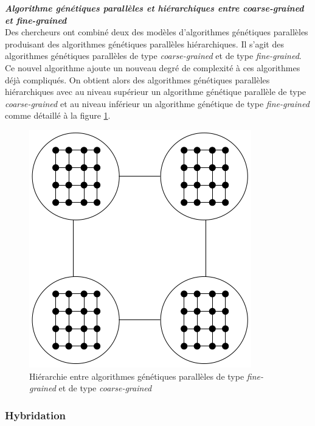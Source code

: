 	\textsl{\textbf{Algorithme génétiques parallèles et hiérarchiques entre \emph{coarse-grained} et \emph{fine-grained}}}\\
	
	Des chercheurs \cite{cant2} ont combiné deux des modèles d'algorithmes génétiques parallèles produisant des algorithmes génétiques parallèles hiérarchiques. Il s'agit des algorithmes génétiques parallèles de type \emph{coarse-grained} et de type \emph{fine-grained}. Ce nouvel algorithme ajoute un nouveau degré de complexité à ces algorithmes déjà compliqués. On obtient alors des algorithmes génétiques parallèles hiérarchiques avec au niveau supérieur un algorithme génétique parallèle de type \emph{coarse-grained} et au niveau inférieur un algorithme génétique de type \emph{fine-grained} comme détaillé à la figure \ref{fig:hierar_fine_grained_fig}.
	
	\begin{figure}[!h]
		\begin{center}
			\includegraphics[scale=.3]{images/hierar_fine_grained_fig.png}
			\caption{Hiérarchie entre algorithmes génétiques parallèles de type \emph{fine-grained} et de type \emph{coarse-grained} \cite{cant2}}
			\label{fig:hierar_fine_grained_fig}
		\end{center}
	\end{figure} 
	
	\subsubsection{Hybridation}
	
